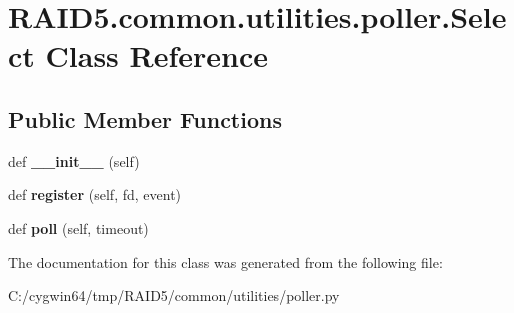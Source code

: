 \hypertarget{class_r_a_i_d5_1_1common_1_1utilities_1_1poller_1_1_select}{}\section{R\+A\+I\+D5.\+common.\+utilities.\+poller.\+Select Class Reference}
\label{class_r_a_i_d5_1_1common_1_1utilities_1_1poller_1_1_select}
\subsection*{Public Member Functions}
\begin{DoxyCompactItemize}
\item 
\mbox{\label{class_r_a_i_d5_1_1common_1_1utilities_1_1poller_1_1_select_a4e90bc039ac43cb00783237f88617b9c}} 
def {\bfseries \+\_\+\+\_\+init\+\_\+\+\_\+} (self)
\item 
\mbox{\label{class_r_a_i_d5_1_1common_1_1utilities_1_1poller_1_1_select_a7415a0da66a75827102528640ad3abce}} 
def {\bfseries register} (self, fd, event)
\item 
\mbox{\label{class_r_a_i_d5_1_1common_1_1utilities_1_1poller_1_1_select_a9c6235184e1937bdf9a0f384058888c0}} 
def {\bfseries poll} (self, timeout)
\end{DoxyCompactItemize}


The documentation for this class was generated from the following file\+:\begin{DoxyCompactItemize}
\item 
C\+:/cygwin64/tmp/\+R\+A\+I\+D5/common/utilities/poller.\+py\end{DoxyCompactItemize}
